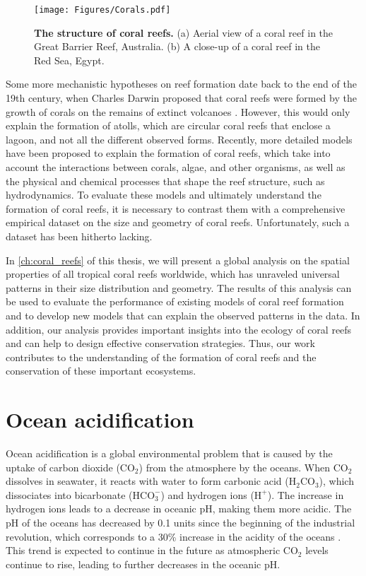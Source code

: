 \begin{figure}[H]
  \centering
  \texttt{[image: Figures/Corals.pdf]}
  \caption[The structure of a coral reef]{
    \textbf{The structure of coral reefs.} (a) Aerial view of a coral reef in
    the Great Barrier Reef, Australia. (b) A close-up of a coral reef in the
    Red Sea, Egypt.}
  \label{fig:Coral_reef}
\end{figure}

Some more mechanistic hypotheses on reef formation date back to the end of
the
19th century, when Charles Darwin proposed that coral reefs were formed by
the
growth of corals on the remains of extinct volcanoes
\cite{darwin1874structure}. However, this would only explain the formation of
atolls, which are circular coral reefs that enclose a lagoon, and not all the
different observed forms. Recently, more detailed models have been proposed
to explain the formation of coral reefs, which take into account the
interactions between corals, algae, and other organisms, as well as the
physical and chemical processes that shape the reef structure, such as
hydrodynamics. To evaluate these models and ultimately understand the
formation of coral reefs, it is necessary to contrast them with a
comprehensive
empirical dataset on the size and geometry of coral reefs. Unfortunately,
such
a dataset has been hitherto lacking.

In \cref{ch:coral_reefs} of this thesis, we will present a global analysis on
the spatial properties of all tropical coral reefs worldwide, which has
unraveled universal patterns in their size distribution and geometry. The
results of this analysis can be used to evaluate the performance of existing
models of coral reef formation and to develop new models that can explain the
observed patterns in the data. In addition, our analysis provides important
insights into the ecology of coral reefs and can help to design effective
conservation strategies. Thus, our work contributes to the understanding of
the
formation of coral reefs and the conservation of these important ecosystems.

\section{\label{sec:Ocean acidification} Ocean acidification}

Ocean acidification is a global environmental problem that is caused by the
uptake of carbon dioxide (CO$_2$) from the atmosphere by the oceans. When
CO$_2$ dissolves in seawater, it reacts with water to form carbonic acid
($\textrm{H}_2\textrm{CO}_3$), which dissociates into bicarbonate
($\textrm{HCO}_3^-$) and hydrogen ions ($\textrm{H}^+$). The increase in
hydrogen ions leads to a decrease in oceanic pH, making them more
acidic. The pH of the oceans has decreased by 0.1 units since the beginning
of the industrial revolution, which corresponds to a 30\% increase in the
acidity of the oceans \cite{Orr2005}. This trend is expected to continue in the
future as atmospheric CO$_2$ levels continue to rise, leading to further
decreases in the oceanic pH.

